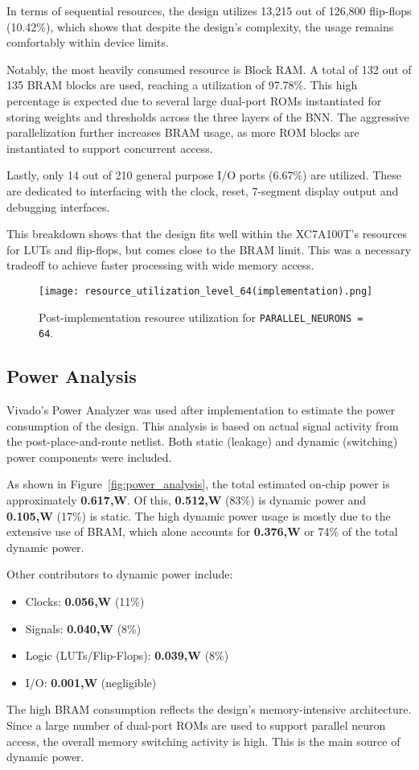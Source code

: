 \documentclass[a4paper,12pt]{report}
\begin{document}
In terms of sequential resources, the design utilizes 13,215 out of 126,800 flip-flops (10.42\%), which shows that despite the design's complexity, the usage remains comfortably within device limits.

Notably, the most heavily consumed resource is  Block RAM. A total of 132 out of 135 BRAM blocks are used, reaching a utilization of 97.78\%. This high percentage is expected due to several large dual-port ROMs instantiated for storing weights and thresholds across the three layers of the BNN. The aggressive parallelization further increases BRAM usage, as more ROM blocks are instantiated to support concurrent access.

Lastly, only 14 out of 210 general purpose I/O ports (6.67\%) are utilized. These are dedicated to interfacing with the clock, reset, 7-segment display output and debugging interfaces.

This breakdown shows that the design fits well within the XC7A100T’s resources for LUTs and flip-flops, but comes close to the BRAM limit. This was a necessary tradeoff to achieve faster processing with wide memory access.

\begin{figure}[H]
    \centering
    \texttt{[image: resource\_utilization\_level\_64(implementation).png]}
    \caption{Post-implementation resource utilization for \texttt{PARALLEL\_NEURONS = 64}.}
    \label{fig:resource_utilization}
\end{figure}


\subsection{Power Analysis}
Vivado’s Power Analyzer was used after implementation to estimate the power consumption of the design. This analysis is based on actual signal activity from the post-place-and-route netlist. Both static (leakage) and dynamic (switching) power components were included.

As shown in Figure~\ref{fig:power_analysis}, the total estimated on-chip power is approximately \textbf{0.617,W}. Of this, \textbf{0.512,W} (83\%) is dynamic power and \textbf{0.105,W} (17\%) is static. The high dynamic power usage is mostly due to the extensive use of BRAM, which alone accounts for \textbf{0.376,W} or 74\% of the total dynamic power.

Other contributors to dynamic power include:
\vspace{-2em}
\begin{itemize}
    \item Clocks: \textbf{0.056,W} (11\%)
    \item Signals: \textbf{0.040,W} (8\%)
    \item Logic (LUTs/Flip-Flops): \textbf{0.039,W} (8\%)
    \item I/O: \textbf{0.001,W} (negligible)
\end{itemize}
\vspace{-2em}
The high BRAM consumption reflects the design’s memory-intensive architecture. Since a large number of dual-port ROMs are used to support parallel neuron access, the overall memory switching activity is high. This is the main source of dynamic power.
\end{document}
